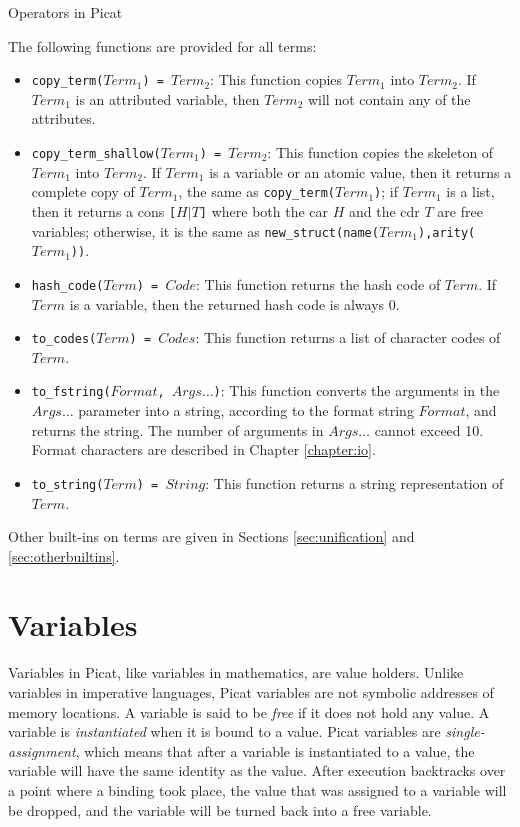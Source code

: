\begin{table}
\caption{\label{tab:ops}Operators in Picat}

\end{table}

The following functions are provided for all terms:
\begin{itemize}
\item \texttt{copy\_term($Term_1$) = $Term_2$}: This function copies $Term_1$ into $Term_2$.  If $Term_1$ is an attributed variable, then $Term_2$ will not contain any of the attributes.
\item \texttt{copy\_term\_shallow($Term_1$) = $Term_2$}: This function copies the skeleton of $Term_1$ into $Term_2$. If $Term_1$ is a variable or an atomic value, then it returns a complete copy of $Term_1$, the same as \texttt{copy\_term($Term_1$)}; if $Term_1$ is a list, then it returns a cons \texttt{[$H$$|$$T$]} where both the car $H$ and the cdr $T$ are free variables; otherwise, it is the same as \texttt{new\_struct(name($Term_1$),arity($Term_1$))}.
\item \texttt{hash\_code($Term$) = $Code$}: This function returns the hash code of $Term$. If $Term$ is a variable, then the returned hash code is always 0.
\item \texttt{to\_codes($Term$) = $Codes$}: This function returns a list of character codes of $Term$.
\item \texttt{to\_fstring($Format$, $Args\ldots$)}: This function converts the arguments in the $Args\ldots$ parameter into a string, according to the format string $Format$, and returns the string. The number of arguments in $Args\ldots$ cannot exceed 10. Format characters are described in Chapter \ref{chapter:io}.
\item \texttt{to\_string($Term$) = $String$}: This function returns a string representation of $Term$.
\end{itemize}
Other built-ins on terms are given in Sections \ref{sec:unification} and \ref{sec:otherbuiltins}.

\section{Variables}
Variables in Picat, like variables in mathematics, are value holders. Unlike variables in imperative languages, Picat variables are not symbolic addresses of memory locations. A variable is said to be \emph{free} if it does not hold any value. A variable is \emph{instantiated} when it is bound to a value. Picat variables are \emph{single-assignment}, which means that after a variable is instantiated to a value, the variable will have the same identity as the value. After execution backtracks over a point where a binding took place, the value that was assigned to a variable will be dropped, and the variable will be turned back into a free variable.

